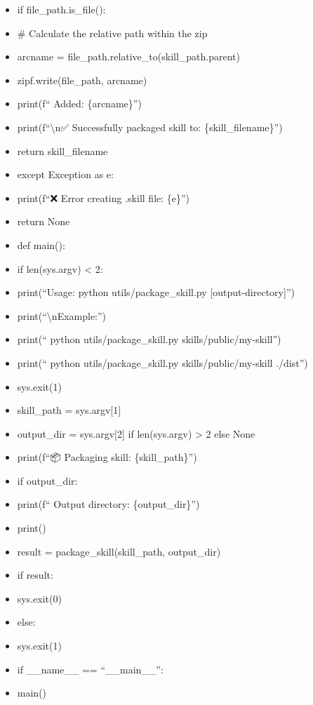 \documentclass[11pt]{article}
\begin{document}
\begin{itemize}[leftmargin=*,itemsep=2pt,topsep=2pt]
\item {} if file\_\allowbreak{}path.is\_\allowbreak{}file():
\item {} \# Calculate the relative path within the zip
\item {} arcname = file\_\allowbreak{}path.relative\_\allowbreak{}to(skill\_\allowbreak{}path.parent)
\item {} zipf.write(file\_\allowbreak{}path, arcname)
\item {} print(f`` Added: \{arcname\}'')
\item {} print(f``\textbackslash{}n✅ Successfully packaged skill to: \{skill\_\allowbreak{}filename\}'')
\item {} return skill\_\allowbreak{}filename
\item {} except Exception as e:
\item {} print(f``❌ Error creating .skill file: \{e\}'')
\item {} return None
\item {} def main():
\item {} if len(sys.argv) < 2:
\item {} print(``Usage: python utils/package\_\allowbreak{}skill.py [output-directory]'')
\item {} print(``\textbackslash{}nExample:'')
\item {} print(`` python utils/package\_\allowbreak{}skill.py skills/public/my-skill'')
\item {} print(`` python utils/package\_\allowbreak{}skill.py skills/public/my-skill ./dist'')
\item {} sys.exit(1)
\item {} skill\_\allowbreak{}path = sys.argv[1]
\item {} output\_\allowbreak{}dir = sys.argv[2] if len(sys.argv) > 2 else None
\item {} print(f``📦 Packaging skill: \{skill\_\allowbreak{}path\}'')
\item {} if output\_\allowbreak{}dir:
\item {} print(f`` Output directory: \{output\_\allowbreak{}dir\}'')
\item {} print()
\item {} result = package\_\allowbreak{}skill(skill\_\allowbreak{}path, output\_\allowbreak{}dir)
\item {} if result:
\item {} sys.exit(0)
\item {} else:
\item {} sys.exit(1)
\item {} if \_\allowbreak{}\_\allowbreak{}name\_\allowbreak{}\_\allowbreak{} == ``\_\allowbreak{}\_\allowbreak{}main\_\allowbreak{}\_\allowbreak{}'':
\item {} main()
\end{itemize}
\end{document}
